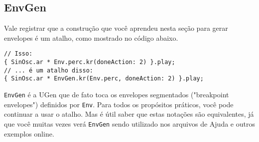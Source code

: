 \subsection{EnvGen}

Vale registrar que a construção que você aprendeu nesta seção para gerar envelopes é um atalho, como mostrado no código abaixo.

\begin{lstlisting}[style=SuperCollider-IDE, basicstyle=\scttfamily\footnotesize]
// Isso:
{ SinOsc.ar * Env.perc.kr(doneAction: 2) }.play;
// ... é um atalho disso:
{ SinOsc.ar * EnvGen.kr(Env.perc, doneAction: 2) }.play;
\end{lstlisting}

\texttt{EnvGen} é a UGen que de fato toca os envelopes segmentados ("breakpoint envelopes") definidos por \texttt{Env}. Para todos os propósitos práticos, você pode continuar a usar o atalho. Mas é útil saber que estas notações são equivalentes, já que você muitas vezes verá  \texttt{EnvGen} sendo utilizado nos arquivos de Ajuda e outros exemplos online.
